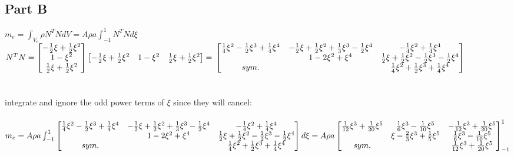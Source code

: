 \documentclass{article}
\begin{document}
\subsection*{Part B}
$m_e=\int_{V_e}\rho N^TNdV=A\rho a\int_{-1}^{1}N^TNd\xi$ \\
$N^TN=\begin{bmatrix}
    -\frac{1}{2}\xi+\frac{1}{2}\xi^2 \\ 1-\xi^2 \\ \frac{1}{2}\xi+\frac{1}{2}\xi^2
\end{bmatrix}\begin{bmatrix}
    -\frac{1}{2}\xi+\frac{1}{2}\xi^2 & 1-\xi^2 & \frac{1}{2}\xi+\frac{1}{2}\xi^2
\end{bmatrix}=\\ \begin{bmatrix}
    \frac{1}{4}\xi^2-\frac{1}{2}\xi^3+\frac{1}{4}\xi^4 &
    -\frac{1}{2}\xi+\frac{1}{2}\xi^2+\frac{1}{3}\xi^3-\frac{1}{2}\xi^4 &
    -\frac{1}{4}\xi^2+\frac{1}{4}\xi^4 \\
    & 1-2\xi^2+\xi^4 & \frac{1}{2}\xi+\frac{1}{2}\xi^2-\frac{1}{2}\xi^3-\frac{1}{2}\xi^4 \\
    sym. & & \frac{1}{4}\xi^2+\frac{1}{2}\xi^3+\frac{1}{4}\xi^4
\end{bmatrix}$ \\\\\\
integrate and ignore the odd power terms of $\xi$ since they will cancel: \\\\
$m_e=A\rho a\int_{-1}^{1}\begin{bmatrix}
    \frac{1}{4}\xi^2-\frac{1}{2}\xi^3+\frac{1}{4}\xi^4 &
    -\frac{1}{2}\xi+\frac{1}{2}\xi^2+\frac{1}{3}\xi^3-\frac{1}{2}\xi^4 &
    -\frac{1}{4}\xi^2+\frac{1}{4}\xi^4 \\
    & 1-2\xi^2+\xi^4 & \frac{1}{2}\xi+\frac{1}{2}\xi^2-\frac{1}{2}\xi^3-\frac{1}{2}\xi^4 \\
    sym. & & \frac{1}{4}\xi^2+\frac{1}{2}\xi^3+\frac{1}{4}\xi^4
\end{bmatrix}d\xi= \\\\
A\rho a\begin{bmatrix}
    \frac{1}{12}\xi^3+\frac{1}{20}\xi^5 & \frac{1}{6}\xi^3-\frac{1}{10}\xi^5 &
    -\frac{1}{12}\xi^3+\frac{1}{20}\xi^5 \\
    & \xi-\frac{2}{3}\xi^3+\frac{1}{5}\xi^5 & \frac{1}{6}\xi^3-\frac{1}{10}\xi^5 \\
    sym. & & \frac{1}{12}\xi^3+\frac{1}{20}\xi^5
\end{bmatrix}_{-1}^1$ \\
\end{document}
